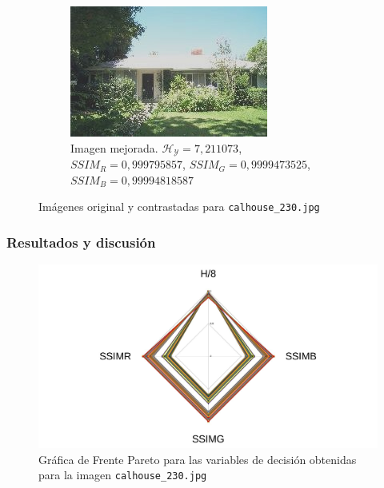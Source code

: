 \documentclass[usenames,dvipsnames]{beamer}
\begin{document}
\begin{frame}
\begin{figure}[H]
\begin{subfigure}[t]{0.45\textwidth}
    \includegraphics[width=\textwidth]{graphics/calhouse_0230_20-20-0020072469292179818.jpg}
    \caption{Imagen mejorada. $\mathscr{H_Y}=7,211073$, $SSIM_R=0,999795857$, $SSIM_G=0,9999473525$, $SSIM_B=0,99994818587$}
    \label{fig:casa1enhanced3}
    \end{subfigure}

    \caption{Imágenes original y contrastadas para \texttt{calhouse\_230.jpg}}\label{fig:casa1}
    \end{figure}

    \end{frame}


\begin{frame}
\frametitle{Resultados y discusión} 

\begin{figure}[H]
\centering
    \includegraphics[width=\textwidth]{graphics/calhouse_230_2.jpg}
    \caption{Gráfica de Frente Pareto para las variables de decisión obtenidas para la imagen \texttt{calhouse\_230.jpg}}
    \label{fig:casa1enhancedfp}
\end{figure}

\end{frame}
\end{document}
